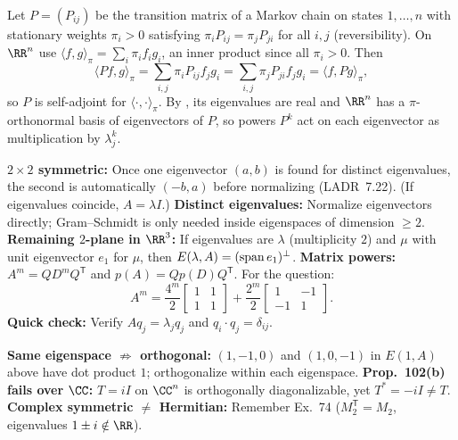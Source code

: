 \documentclass[10pt]{scrartcl}
\begin{document}
\begin{example*}
  Let $P=(P_{ij})$ be the transition matrix of a Markov chain on states $1,\dots,n$ with stationary weights $\pi_i>0$ satisfying $\pi_iP_{ij}=\pi_jP_{ji}$ for all $i,j$ (reversibility). On $\RR^n$ use $\langle f,g\rangle_\pi=\sum_i\pi_if_ig_i$, an inner product since all $\pi_i>0$. Then
  \[ \langle Pf,g\rangle_\pi=\sum_{i,j}\pi_iP_{ij}f_jg_i=\sum_{i,j}\pi_jP_{ji}f_jg_i=\langle f,Pg\rangle_\pi, \]
  so $P$ is self-adjoint for $\langle\cdot,\cdot\rangle_\pi$. By , its eigenvalues are real and $\RR^n$ has a $\pi$-orthonormal basis of eigenvectors of $P$, so powers $P^k$ act on each eigenvector as multiplication by $\lambda_j^k$.
\end{example*}

\begin{shortcuts}
  \ii \textbf{$2\times2$ symmetric:} Once one eigenvector $(a,b)$ is found for distinct eigenvalues, the second is automatically $(-b,a)$ before normalizing (LADR~7.22). (If eigenvalues coincide, $A=\lambda I$.)
  \ii \textbf{Distinct eigenvalues:} Normalize eigenvectors directly; Gram--Schmidt is only needed inside eigenspaces of dimension $\ge2$.
  \ii \textbf{Remaining $2$-plane in $\RR^3$:} If eigenvalues are $\lambda$ (multiplicity $2$) and $\mu$ with unit eigenvector $e_1$ for $\mu$, then $E(\lambda,A)=(\operatorname{span} e_1)^\perp$.
  \ii \textbf{Matrix powers:} $A^m = QD^m Q^{\mathsf T}$ and $p(A)=Qp(D)Q^{\mathsf T}$. For the question:
  \[
    A^m = \frac{4^m}{2}\begin{bmatrix}1&1\\1&1\end{bmatrix}+\frac{2^m}{2}\begin{bmatrix}1&-1\\-1&1\end{bmatrix}.
  \]
  \ii \textbf{Quick check:} Verify $Aq_j=\lambda_j q_j$ and $q_i\cdot q_j=\delta_{ij}$.
\end{shortcuts}

\begin{trapbox}
  \ii \textbf{Same eigenspace $\not\Rightarrow$ orthogonal:} $(1,-1,0)$ and $(1,0,-1)$ in $E(1,A)$ above have dot product $1$; orthogonalize within each eigenspace.
  \ii \textbf{Prop.~102(b) fails over $\CC$:} $T=iI$ on $\CC^n$ is orthogonally diagonalizable, yet $T^*=-iI\neq T$.
  \ii \textbf{Complex symmetric $\neq$ Hermitian:} Remember Ex.~74 ($M_2^{\mathsf T}=M_2$, eigenvalues $1\pm i\notin\RR$).
\end{trapbox}
\end{document}
